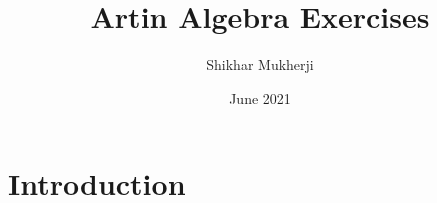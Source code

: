 \documentclass{article}
\title{Artin Algebra Exercises}
\author{Shikhar Mukherji}
\date{June 2021}
\begin{document}
\maketitle

\section*{Introduction}
\end{document}

